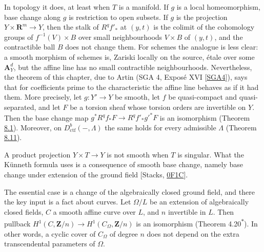 \documentclass[11pt]{article}
\newcommand{\bpout}[1]{#1\textsuperscript{\hyperlink{bp-outside}{\ensuremath{\ast}}}}
\begin{document}
In topology it does, at least when \(T\) is a manifold. If \(g\) is a local homeomorphism, base change along \(g\) is restriction to open subsets. If \(g\) is the projection \(Y\times\mathbf R^m\to Y\), then the stalk of \(R^qf'_*\) at \((y,t)\) is the colimit of the cohomology groups of \(f^{-1}(V)\times B\) over small neighbourhoods \(V\times B\) of \((y,t)\), and the contractible ball \(B\) does not change them. For schemes the analogue is less clear: a smooth morphism of schemes is, Zariski locally on the source, étale over some \(\mathbf A^d_Y\), but the affine line has no small contractible neighbourhoods. Nevertheless, the theorem of this chapter, due to Artin (SGA 4, Exposé XVI [\hyperref[bp66]{SGA4}]), says that for coefficients prime to the characteristic the affine line behaves as if it had them. More precisely, let \(g:Y'\to Y\) be smooth, let \(f\) be quasi-compact and quasi-separated, and let \(F\) be a torsion sheaf whose torsion orders are invertible on \(Y\). Then the base change map \(g^*R^qf_*F\to R^qf'_*g'^*F\) is an isomorphism (Theorem \hyperref[bp7]{8.1}). Moreover, on \(D^b_{\mathrm{ctf}}(-,\Lambda)\) the same holds for every admissible \(\Lambda\) (Theorem \hyperref[bp45]{8.11}).

A product projection \(Y\times T\to Y\) is not smooth when \(T\) is singular. What the Künneth formula uses is a consequence of smooth base change, namely base change under extension of the ground field [Stacks, \href{https://stacks.math.columbia.edu/tag/0F1C}{0F1C}].

The essential case is a change of the algebraically closed ground field, and there the key input is a fact about curves. Let \(\Omega/L\) be an extension of algebraically closed fields, \(C\) a smooth affine curve over \(L\), and \(n\) invertible in \(L\). Then pullback \(H^1(C,\mathbf Z/n)\to H^1(C_\Omega,\mathbf Z/n)\) is an isomorphism (Theorem \bpout{4.20}). In other words, a cyclic cover of \(C_\Omega\) of degree \(n\) does not depend on the extra transcendental parameters of \(\Omega\).
\end{document}
